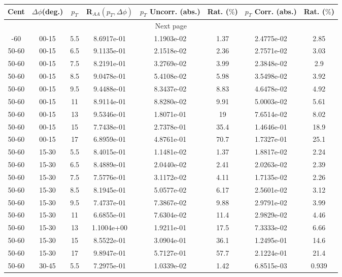             
\begin{longtable}{|cccccccc|}
\hline
Cent & $\Delta\phi$(deg.) & $p_{T}$ & R$_{AA}(p_{T},\Delta\phi)$ & $p_{T}$ Uncorr. (abs.) & Rat. ($\%$) & $p_{T}$ Corr. (abs.) & Rat. ($\%$)  \\
\hline
\endhead
\hline \multicolumn{8}{|c|}{{Next page}} \\
\hline
\endfoot
\endlastfoot
\hline
50-60 & 00-15 & 5.5 & 8.6917e-01 & 1.1903e-02 & 1.37 & 2.4775e-02 & 2.85 \\ 
50-60 & 00-15 & 6.5 & 9.1135e-01 & 2.1518e-02 & 2.36 & 2.7571e-02 & 3.03 \\ 
50-60 & 00-15 & 7.5 & 8.2191e-01 & 3.2769e-02 & 3.99 & 2.3848e-02 & 2.9 \\ 
50-60 & 00-15 & 8.5 & 9.0478e-01 & 5.4108e-02 & 5.98 & 3.5498e-02 & 3.92 \\ 
50-60 & 00-15 & 9.5 & 9.4488e-01 & 8.3437e-02 & 8.83 & 4.6478e-02 & 4.92 \\ 
50-60 & 00-15 & 11 & 8.9114e-01 & 8.8280e-02 & 9.91 & 5.0003e-02 & 5.61 \\ 
50-60 & 00-15 & 13 & 9.5346e-01 & 1.8071e-01 & 19 & 7.6514e-02 & 8.02 \\ 
50-60 & 00-15 & 15 & 7.7438e-01 & 2.7378e-01 & 35.4 & 1.4646e-01 & 18.9 \\ 
50-60 & 00-15 & 17 & 6.8959e-01 & 4.8761e-01 & 70.7 & 1.7327e-01 & 25.1 \\ 
\hline
50-60 & 15-30 & 5.5 & 8.4015e-01 & 1.1481e-02 & 1.37 & 1.8817e-02 & 2.24 \\ 
50-60 & 15-30 & 6.5 & 8.4889e-01 & 2.0440e-02 & 2.41 & 2.0263e-02 & 2.39 \\ 
50-60 & 15-30 & 7.5 & 7.5776e-01 & 3.1172e-02 & 4.11 & 1.7135e-02 & 2.26 \\ 
50-60 & 15-30 & 8.5 & 8.1945e-01 & 5.0577e-02 & 6.17 & 2.5601e-02 & 3.12 \\ 
50-60 & 15-30 & 9.5 & 7.4737e-01 & 7.3867e-02 & 9.88 & 2.9791e-02 & 3.99 \\ 
50-60 & 15-30 & 11 & 6.6855e-01 & 7.6304e-02 & 11.4 & 2.9829e-02 & 4.46 \\ 
50-60 & 15-30 & 13 & 1.1004e+00 & 1.9211e-01 & 17.5 & 7.3333e-02 & 6.66 \\ 
50-60 & 15-30 & 15 & 8.5522e-01 & 3.0904e-01 & 36.1 & 1.2495e-01 & 14.6 \\ 
50-60 & 15-30 & 17 & 9.8947e-01 & 5.7127e-01 & 57.7 & 2.1224e-01 & 21.4 \\ 
\hline
50-60 & 30-45 & 5.5 & 7.2975e-01 & 1.0339e-02 & 1.42 & 6.8515e-03 & 0.939 \\ 

\end{longtable}
